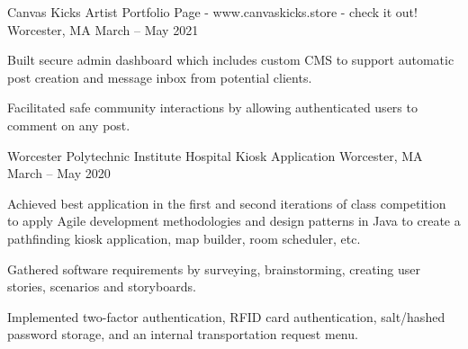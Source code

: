 

\begin{cventries}

\cventry
    {Canvas Kicks} %
    {Artist Portfolio Page - www.canvaskicks.store - check it out!} %
    {Worcester, MA} %
    {March – May 2021} %
    {
      \begin{cvitems} %
       \item {Built secure admin dashboard which includes custom CMS to support automatic post creation and message inbox from potential clients.}
       \item {Facilitated safe community interactions by allowing authenticated users to comment on any post.}
      \end{cvitems}
    }


  \cventry
    {Worcester Polytechnic Institute} %
    {Hospital Kiosk Application } %
    {Worcester, MA} %
    {March – May 2020} %
    {
      \begin{cvitems} %
       \item {Achieved best application in the first and second iterations of class competition to apply Agile development methodologies and
        design patterns in Java to create a pathfinding kiosk application, map builder, room scheduler, etc.}
        \item {Gathered software requirements by surveying, brainstorming, creating user stories, scenarios and storyboards.}
        \item {Implemented two-factor authentication, RFID card authentication, salt/hashed password storage, and an internal transportation request menu.}
      \end{cvitems}
    }



\end{cventries}

